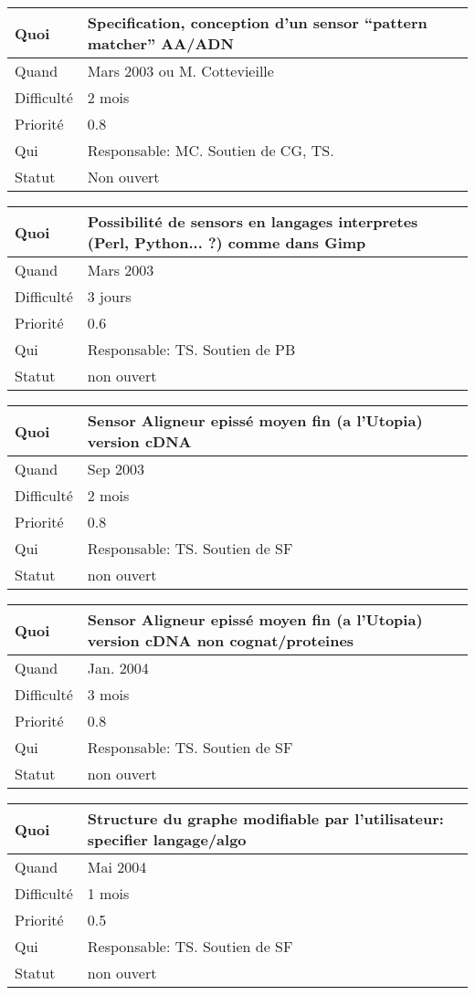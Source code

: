 \documentclass[a4paper,11pt]{article}
\begin{document}
\begin{longtable}{|l|p{7cm}|}\hline
  Quoi & Specification, conception d'un sensor ``pattern matcher'' AA/ADN \\\hline
  Quand  &  Mars 2003 ou M. Cottevieille\\\hline
  Difficult\'e &  2 mois\\\hline
  Priorit\'e &  0.8 \\\hline
  Qui & Responsable: MC. Soutien de CG, TS.\\\hline
  Statut & Non ouvert\\\hline
\end{longtable}

\begin{longtable}{|l|p{7cm}|}\hline
  Quoi & Possibilit\'e de sensors en langages interpretes (Perl, Python... ?)
comme dans Gimp \\\hline
  Quand  &   Mars 2003 \\\hline
  Difficult\'e &  3 jours\\\hline
  Priorit\'e & 0.6 \\\hline
  Qui & Responsable: TS. Soutien de PB\\\hline
  Statut & non ouvert\\\hline
\end{longtable}

\begin{longtable}{|l|p{7cm}|}\hline
  Quoi & Sensor Aligneur episs{\'e} moyen fin (a l'Utopia) version cDNA\\\hline
  Quand  &  Sep 2003\\\hline
  Difficult\'e &  2 mois\\\hline
  Priorit\'e &  0.8\\\hline
  Qui & Responsable: TS. Soutien de SF\\\hline
  Statut & non ouvert\\\hline
\end{longtable}

\begin{longtable}{|l|p{7cm}|}\hline
  Quoi & Sensor Aligneur episs{\'e} moyen fin (a l'Utopia) version cDNA non
cognat/proteines \\\hline
  Quand  &  Jan. 2004\\\hline
  Difficult\'e &  3 mois\\\hline
  Priorit\'e &  0.8\\\hline
  Qui & Responsable: TS. Soutien de SF\\\hline
  Statut & non ouvert\\\hline
\end{longtable}

\begin{longtable}{|l|p{7cm}|}\hline
  Quoi & Structure du graphe modifiable par l'utilisateur: specifier
langage/algo \\\hline
  Quand   & Mai 2004 \\\hline
  Difficult\'e & 1 mois \\\hline
  Priorit\'e &  0.5\\\hline
  Qui & Responsable: TS. Soutien de SF\\\hline
  Statut & non ouvert\\\hline
\end{longtable}
\end{document}
